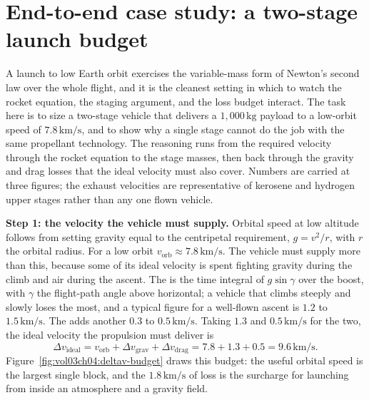 







\section{End-to-end case study: a two-stage launch
budget}

A launch to low Earth orbit exercises the variable-mass form of
Newton's second law over the whole flight, and it is the cleanest
setting in which to watch the rocket equation, the staging argument,
and the loss budget interact. The task here is to size a two-stage
vehicle that delivers a $1{,}000\,\si{\kilogram}$ payload to a
low-orbit speed of $7.8\,\si{\kilo\meter\per\second}$, and to show why
a single stage cannot do the job with the same propellant technology.
The reasoning runs from the required velocity through the rocket
equation to the stage masses, then back through the gravity and drag
losses that the ideal velocity must also cover. Numbers are carried at
three figures; the exhaust velocities are representative of kerosene
and hydrogen upper stages rather than any one flown vehicle.

\textbf{Step 1: the velocity the vehicle must supply.} Orbital speed at
low altitude follows from setting gravity equal to the centripetal
requirement, $g=v^{2}/r$, with $r$ the orbital radius. For a low orbit
$v_{\text{orb}}\approx 7.8\,\si{\kilo\meter\per\second}$. The vehicle
must supply more than this, because some of its ideal velocity is spent
fighting gravity during the climb and air during the ascent. The
 is the time integral of $g\sin\gamma$ over the
boost, with $\gamma$ the flight-path angle above horizontal; a vehicle
that climbs steeply and slowly loses the most, and a typical figure for
a well-flown ascent is $1.2$ to $1.5\,\si{\kilo\meter\per\second}$. The
 adds another $0.3$ to
$0.5\,\si{\kilo\meter\per\second}$. Taking $1.3$ and
$0.5\,\si{\kilo\meter\per\second}$ for the two, the ideal velocity the
propulsion must deliver is
\[
\Delta v_{\text{ideal}}=v_{\text{orb}}+\Delta v_{\text{grav}}
+\Delta v_{\text{drag}}=7.8+1.3+0.5=9.6\,\si{\kilo\meter\per\second}.
\]
Figure~\ref{fig:vol03ch04:deltav-budget} draws this budget: the useful
orbital speed is the largest single block, and the $1.8\,\si{\kilo\meter
\per\second}$ of loss is the surcharge for launching from inside an
atmosphere and a gravity field.

